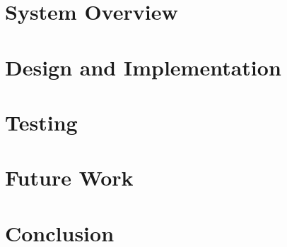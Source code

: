 \documentclass[a4paper, 12pt]{report}
\begin{document}
\chapter{System Overview}

\chapter{Design and Implementation}

\chapter{Testing}

\chapter{Future Work}

\chapter{Conclusion}

\printbibliography
\end{document}
